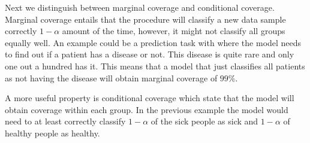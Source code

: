 Next we distinguish between marginal coverage and conditional coverage. Marginal coverage entails that the procedure will classify a new data sample correctly $1 - \alpha$ amount of the time, however, it might not classify all groups equally well. An example could be a prediction task with where the model needs to find out if a patient has a disease or not. This disease is quite rare and only one out a hundred has it. This means that a model that just classifies all patients as not having the disease will obtain marginal coverage of $99\%$. 

A more useful property is conditional coverage which state that the model will obtain coverage within each group. In the previous example the model would need to at least correctly classify $1-\alpha$ of the sick people as sick and $1 - \alpha$ of healthy people as healthy.